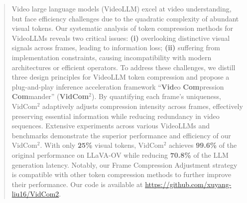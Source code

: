 \begin{abstract}

Video large language models (VideoLLM) excel at video understanding, but face efficiency challenges due to the quadratic complexity of abundant visual tokens. 
Our systematic analysis of token compression methods for VideoLLMs reveals two critical issues: \textbf{(i)} overlooking distinctive visual signals across frames, leading to information loss; \textbf{(ii)} suffering from implementation constraints, causing incompatibility with modern architectures or efficient operators.
To address these challenges, we distill three design principles for VideoLLM token compression and propose a plug-and-play inference acceleration framework ``\textbf{Vid}eo \textbf{Com}pression \textbf{Com}mander'' (\textbf{VidCom$^2$}). 
By quantifying each frame’s uniqueness, VidCom$^2$ adaptively adjusts compression intensity across frames, effectively preserving essential information while reducing redundancy in video sequences. 
Extensive experiments across various VideoLLMs and benchmarks demonstrate the superior performance and efficiency of our VidCom$^2$. 
With only \textbf{25\%} visual tokens, VidCom$^2$ achieves \textbf{99.6\%} of the original performance on LLaVA-OV while reducing \textbf{70.8\%} of the LLM generation latency. 
Notably, our Frame Compression Adjustment strategy is compatible with other token compression methods to further improve their performance. Our code is available at \url{https://github.com/xuyang-liu16/VidCom2}.
\end{abstract}


